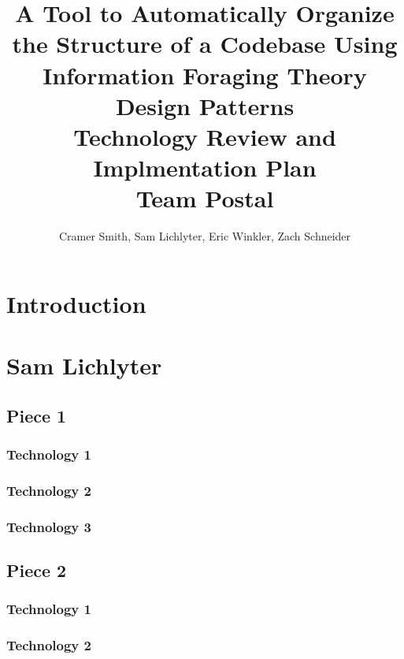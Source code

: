\documentclass[letterpaper,10pt,titlepage,draftclsnofoot,onecolumn,onesided] {IEEEtran}
\def\doctitle{A Tool to Automatically Organize the Structure of a Codebase Using Information Foraging Theory Design Patterns}
\def\doctype{Technology Review and Implmentation Plan}
\def\team{Team Postal}
\begin{document}
\title{\Huge{\bfseries{\textsf{\doctitle}}}\\\textsf{\Large{\doctype}}\\\textsf{\large{\team}}}
\author{Cramer Smith, Sam Lichlyter, Eric Winkler, Zach Schneider}

\maketitle
\vfill
\begin{abstract}


\end{abstract}
\vfill

\pagebreak

\tableofcontents

\pagebreak

\section{Introduction}


\section{Sam Lichlyter}

\subsection{Piece 1}
\subsubsection{Technology 1}
\subsubsection{Technology 2}
\subsubsection{Technology 3}

\subsection{Piece 2}
\subsubsection{Technology 1}
\subsubsection{Technology 2}
\end{document}
